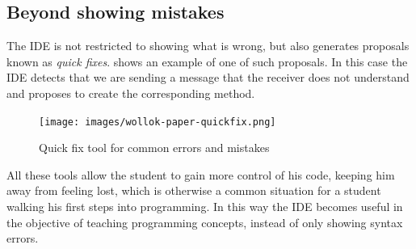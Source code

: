 \subsection{Beyond showing mistakes}
The IDE is not restricted to showing what is wrong, but also generates proposals known as \emph{quick fixes}.
 shows an example of one of such proposals. 
In this case the IDE detects that we are sending a message that the receiver does not understand and proposes to create the corresponding method.

\begin{figure}[ht]
    \centering
	\texttt{[image: images/wollok-paper-quickfix.png]}
    \caption{Quick fix tool for common errors and mistakes}
    \label{fig:quickfix.png}
\end{figure}

All these tools allow the student to gain more control of his code, keeping him away from feeling lost, 
which is otherwise a common situation for a student walking his first steps into programming.
In this way the IDE becomes useful in the objective of teaching programming concepts, instead of only showing syntax errors.

